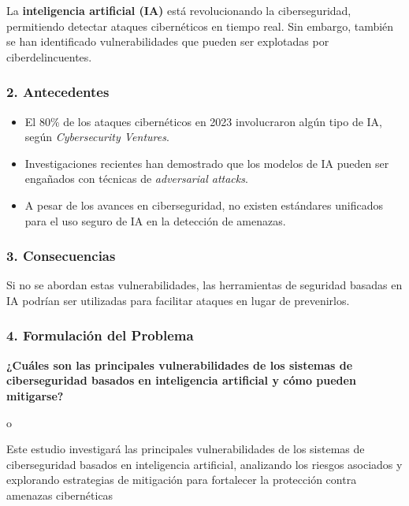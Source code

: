 \documentclass[
  letterpaper,
  DIV=11,
  numbers=noendperiod]{scrartcl}
\providecommand{\tightlist}{%
  \setlength{\itemsep}{0pt}\setlength{\parskip}{0pt}}
\begin{document}
La \textbf{inteligencia artificial (IA)} está revolucionando la
ciberseguridad, permitiendo detectar ataques cibernéticos en tiempo
real. Sin embargo, también se han identificado vulnerabilidades que
pueden ser explotadas por ciberdelincuentes.

\subsubsection{\texorpdfstring{\textbf{2.
Antecedentes}}{2. Antecedentes}}\label{antecedentes-3}

\begin{itemize}
\tightlist
\item
  El 80\% de los ataques cibernéticos en 2023 involucraron algún tipo de
  IA, según \emph{Cybersecurity Ventures}.\\
\item
  Investigaciones recientes han demostrado que los modelos de IA pueden
  ser engañados con técnicas de \emph{adversarial attacks}.\\
\item
  A pesar de los avances en ciberseguridad, no existen estándares
  unificados para el uso seguro de IA en la detección de amenazas.
\end{itemize}

\subsubsection{\texorpdfstring{\textbf{3.
Consecuencias}}{3. Consecuencias}}\label{consecuencias-3}

Si no se abordan estas vulnerabilidades, las herramientas de seguridad
basadas en IA podrían ser utilizadas para facilitar ataques en lugar de
prevenirlos.

\subsubsection{\texorpdfstring{\textbf{4. Formulación del
Problema}}{4. Formulación del Problema}}\label{formulaciuxf3n-del-problema-3}

\textbf{¿Cuáles son las principales vulnerabilidades de los sistemas de
ciberseguridad basados en inteligencia artificial y cómo pueden
mitigarse?}

o

Este estudio investigará las principales vulnerabilidades de los
sistemas de ciberseguridad basados en inteligencia artificial,
analizando los riesgos asociados y explorando estrategias de mitigación
para fortalecer la protección contra amenazas cibernéticas
\end{document}
